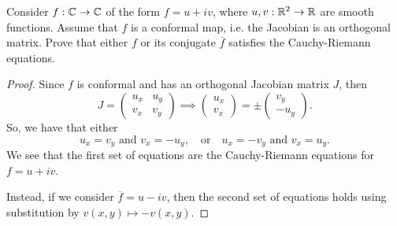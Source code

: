 \documentclass[../hw2]{subfiles}
\begin{document}
\begin{problem}
Consider $f:\mathbb{C}\to \mathbb{C}$ of the form $f = u+iv$, where $u, v : \mathbb{R}^2\to \mathbb{R}$ are smooth functions.
Assume that $f$ is a conformal map, i.e. the Jacobian is an orthogonal matrix.
Prove that either $f$ or its conjugate $\overline{f}$ satisfies the Cauchy-Riemann equations.
\end{problem}
\begin{proof}
	Since $f$ is conformal and has an orthogonal Jacobian matrix $J$, then  \[
		J = \begin{pmatrix} u_x & u_y \\ v_x & v_y \end{pmatrix}
		\implies \begin{pmatrix} u_x \\ v_x \end{pmatrix}
		=  \pm \begin{pmatrix} v_y \\ -u_y \end{pmatrix}
		.\]
	So, we have that either \[
		u_x = v_y \text{ and } v_x = -u_y, \quad \text{or}\quad u_x=-v_y \text{ and } v_x = u_y
		.\]
	We see that the first set of equations are the Cauchy-Riemann equations for $f=u+iv$.

	Instead, if we consider $\overline{f}=u-iv$, then the second set of equations holds using substitution by $v(x,y)\mapsto -v(x,y)$.
\end{proof}
\end{document}
